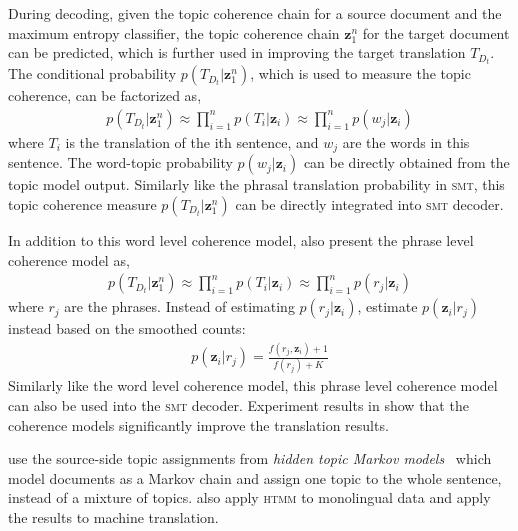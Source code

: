 During decoding, given the topic coherence chain for a source document and the maximum entropy classifier, the topic coherence chain $\textbf{z}_1^n$ for the target document can be predicted, which is further used in improving the target translation $T_{D_t}$. The conditional probability $p(T_{D_t} | \textbf{z}_1^n)$, which is used to measure the topic coherence, can be factorized as,
\begin{align}
p(T_{D_t} | \textbf{z}_1^n) \approx \prod_{i=1}^n p(T_i | \textbf{z}_i) \approx \prod_{i=1}^n p(w_j | \textbf{z}_i)
\end{align}
where $T_i$ is the translation of the ith sentence, and $w_j$ are the words in this sentence. The word-topic probability $p(w_j | \textbf{z}_i)$ can be directly obtained from the topic model output. Similarly like the phrasal translation probability in \textsc{smt}, this topic coherence measure $p(T_{D_t} | \textbf{z}_1^n)$ can be directly integrated into \textsc{smt} decoder.

In addition to this word level coherence model, \citet{xiong-13} also present the phrase level coherence model as,
\begin{align}
p(T_{D_t} | \textbf{z}_1^n) \approx \prod_{i=1}^n p(T_i | \textbf{z}_i) \approx \prod_{i=1}^n p(r_j | \textbf{z}_i)
\end{align}
where $r_j$ are the phrases. Instead of estimating $p(r_j | \textbf{z}_i)$, \citet{xiong-13} estimate $p(\textbf{z}_i | r_j)$ instead based on the smoothed counts:
\begin{align}
p(\textbf{z}_i | r_j) = \frac{f(r_j, \textbf{z}_i)+1}{f(r_j)+K}
\end{align}
Similarly like the word level coherence model, this phrase level coherence model can also be used into the \textsc{smt} decoder. Experiment results in \citet{xiong-13} show that the coherence models significantly improve the translation results.

\citet{hasler-12} use the source-side topic assignments from \emph{hidden topic Markov models}~\citep[\textsc{htmm}]{gruber-07} which model documents as a Markov chain and assign one topic to the whole sentence, instead of a mixture of topics.  \citet{su-12} also apply \textsc{htmm} to monolingual data and apply the results to machine translation.


